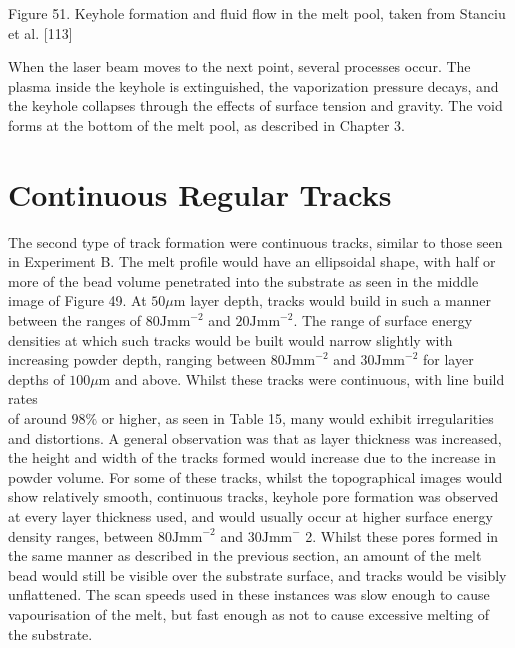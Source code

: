 \documentclass[10pt]{article}
\begin{document}
Figure 51. Keyhole formation and fluid flow in the melt pool, taken from Stanciu et al. [113]

When the laser beam moves to the next point, several processes occur. The plasma inside the keyhole is extinguished, the vaporization pressure decays, and the keyhole collapses through the effects of surface tension and gravity. The void forms at the bottom of the melt pool, as described in Chapter 3.

\section*{Continuous Regular Tracks}
The second type of track formation were continuous tracks, similar to those seen in Experiment B. The melt profile would have an ellipsoidal shape, with half or more of the bead volume penetrated into the substrate as seen in the middle image of Figure 49. At $50 \mu \mathrm{m}$ layer depth, tracks would build in such a manner between the ranges of $80 \mathrm{Jmm}^{-2}$ and $20 \mathrm{Jmm}^{-2}$. The range of surface energy densities at which such tracks would be built would narrow slightly with increasing powder depth, ranging between $80 \mathrm{Jmm}^{-2}$ and $30 \mathrm{Jmm}^{-2}$ for layer depths of $100 \mu \mathrm{m}$ and above. Whilst these tracks were continuous, with line build rates\\
of around $98 \%$ or higher, as seen in Table 15, many would exhibit irregularities and distortions. A general observation was that as layer thickness was increased, the height and width of the tracks formed would increase due to the increase in powder volume. For some of these tracks, whilst the topographical images would show relatively smooth, continuous tracks, keyhole pore formation was observed at every layer thickness used, and would usually occur at higher surface energy density ranges, between $80 \mathrm{Jmm}^{-2}$ and $30 \mathrm{Jmm}^{-}$ 2. Whilst these pores formed in the same manner as described in the previous section, an amount of the melt bead would still be visible over the substrate surface, and tracks would be visibly unflattened. The scan speeds used in these instances was slow enough to cause vapourisation of the melt, but fast enough as not to cause excessive melting of the substrate.
\end{document}
